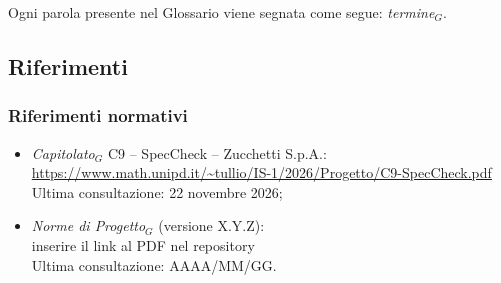\documentclass[a4paper, 11pt]{article}
\newcommand{\term}[1]{\textit{#1}$_G$} %
\newcommand{\tbd}[1]{\colorbox{yellow!60}{#1}}
\begin{document}
Ogni parola presente nel Glossario viene segnata come segue: \term{termine}.

\subsection{Riferimenti}

\subsubsection{Riferimenti normativi}
\begin{itemize}[noitemsep]
    \item \term{Capitolato} C9 -- SpecCheck -- Zucchetti S.p.A.: \\
    \url{https://www.math.unipd.it/~tullio/IS-1/2026/Progetto/C9-SpecCheck.pdf} \\
    Ultima consultazione: \tbd{22 novembre 2026};
    \item \term{Norme di Progetto} (versione \tbd{X.Y.Z}): \\
    \tbd{inserire il link al PDF nel repository}\\
    Ultima consultazione: \tbd{AAAA/MM/GG}.
\end{itemize}
\end{document}

